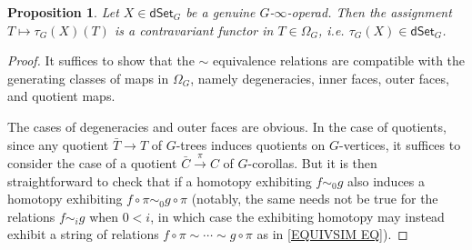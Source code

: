 \documentclass[a4paper,10pt
,draft
]{article}%
\numberwithin{equation}{section}
\numberwithin{figure}{section}
\newtheorem{proposition}[equation]{Proposition}%
\theoremstyle{definition} %
\newcommand{\1}{\ensuremath{\mathbbm 1}}%
\begin{document}
\begin{proposition}
	Let $X \in \mathsf{dSet}_G$ be a genuine $G$-$\infty$-operad. Then the assignment 
	$T \mapsto \tau_G(X)(T)$
	is a contravariant functor in $T \in \Omega_G$, i.e.
	$\tau_G(X) \in \mathsf{dSet}_G$.
\end{proposition}

\begin{proof}
	It suffices to show that the $\sim$ equivalence relations are compatible with the generating classes of maps in $\Omega_G$, namely
	degeneracies, inner faces, outer faces, and quotient maps.
	
	The cases of degeneracies and outer faces are obvious. In the case of quotients, 
	since any quotient $\bar{T} \to T$ of $G$-trees induces quotients on $G$-vertices, it suffices to consider the case of a quotient
	$\bar{C} \xrightarrow{\pi} C$ of $G$-corollas.
	But it is then straightforward to check that if a homotopy exhibiting $f \sim_0 g$ also induces a homotopy exhibiting 
	$f \circ \pi \sim_0 g \circ \pi$
	(notably, the same needs not be true for the relations $f \sim_i g$ when $0<i$, 
	in which case the exhibiting homotopy 
	may instead exhibit a string of relations 
	$f \circ \pi \sim \cdots \sim g \circ \pi$
	as in \eqref{EQUIVSIM EQ}).


\end{proof}
\end{document}
